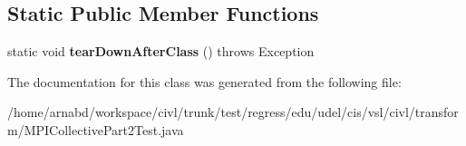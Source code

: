 \subsection*{Static Public Member Functions}
\begin{DoxyCompactItemize}
\item 
\hypertarget{classedu_1_1udel_1_1cis_1_1vsl_1_1civl_1_1transform_1_1MPICollectivePart2Test_aa0e8d7b6d5804fef74b61a6e99d89874}{}static void {\bfseries tear\+Down\+After\+Class} ()  throws Exception \label{classedu_1_1udel_1_1cis_1_1vsl_1_1civl_1_1transform_1_1MPICollectivePart2Test_aa0e8d7b6d5804fef74b61a6e99d89874}

\end{DoxyCompactItemize}


The documentation for this class was generated from the following file\+:\begin{DoxyCompactItemize}
\item 
/home/arnabd/workspace/civl/trunk/test/regress/edu/udel/cis/vsl/civl/transform/M\+P\+I\+Collective\+Part2\+Test.\+java\end{DoxyCompactItemize}
